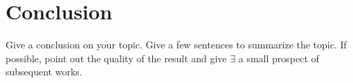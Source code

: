 \section{Conclusion}
\label{sec:conclusion}
Give a conclusion on your topic. Give a few sentences to summarize 
the topic. If possible, point out the quality of the result and give
$ \exists $
a small prospect of subsequent works.

